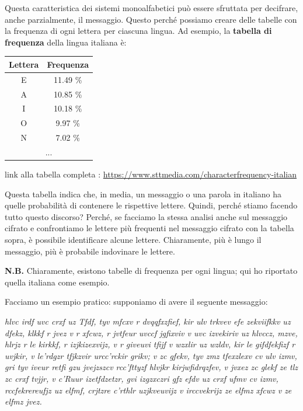 \documentclass{rapport}
\begin{document}
\vspace{0.2cm}
Questa caratteristica dei sistemi monoalfabetici può essere sfruttata per decifrare, anche parzialmente, il messaggio.  
Questo perché possiamo creare delle tabelle con la frequenza di ogni lettera per ciascuna lingua.  
Ad esempio, la \textbf{tabella di frequenza} della lingua italiana è:


\begin{table}[h]
\centering
    \begin{tabular}{cc}
\multicolumn{1}{c|}{Lettera} & Frequenza \\ \hline
\multicolumn{1}{c|}{E}       & 11.49 \%  \\
\multicolumn{1}{c|}{A}       & 10.85 \%  \\
\multicolumn{1}{c|}{I}       & 10.18 \%  \\
\multicolumn{1}{c|}{O}       & 9.97 \%   \\
\multicolumn{1}{c|}{N}       & 7.02 \%   \\
\multicolumn{2}{c}{...}                 
\end{tabular}
\end{table}

\begin{center}
    
link alla tabella completa : \href{https://www.sttmedia.com/characterfrequency-italian}{https://www.sttmedia.com/characterfrequency-italian}
\end{center}

Questa tabella indica che, in media, un messaggio o una parola in italiano ha quelle probabilità di contenere le rispettive lettere.  
Quindi, perché stiamo facendo tutto questo discorso? Perché, se facciamo la stessa analisi anche sul messaggio cifrato e confrontiamo le lettere più frequenti nel messaggio cifrato con la tabella sopra, è possibile identificare alcune lettere.  
Chiaramente, più è lungo il messaggio, più è probabile indovinare le lettere.


\textbf{N.B.} Chiaramente, esistono tabelle di frequenza per ogni lingua; qui ho riportato quella italiana come esempio.

\newpage

Facciamo un esempio pratico: supponiamo di avere il seguente messaggio:
\vspace{0.2cm}

\textit{hlvc irdf uvc crxf uz Tfdf, tyv mfcxv r dvqqfxzfief, kir ulv trkvev efe zekviifkkv uz dfekz, klkkf r jvez v r xfcwz, r jvtfeur uvccf jgfixviv v uvc izvekiriv uz hlvccz, mzve, hlrjz r le kirkkf, r izjkizexvijz, v r giveuvi tfijf v wzxlir uz wzldv, kir le gifdfekfizf r uvjkir, v le’rdgzr tfjkzvir urcc’rckir grikv; v zc gfekv, tyv zmz tfexzlexv cv ulv izmv, gri tyv iveur retfi gzu jvejzszcv rcc’fttyzf hlvjkr kirjwfidrqzfev, v jvxez zc glekf ze tlz zc crxf tvjjr, v c’Ruur izetfdzetzr, gvi izgzxczri gfz efdv uz crxf ufmv cv izmv, rccfekrereufjz uz elfmf, crjtzre c’rthlr uzjkveuvijz v irccvekrijz ze elfmz xfcwz v ze elfmz jvez. }
\vspace{0.2cm}
\end{document}
